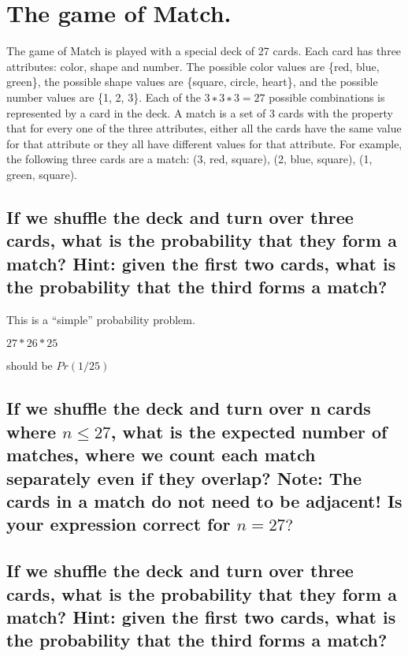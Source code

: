 \documentclass[titlepage]{article}\usepackage[]{graphicx}\usepackage[]{color}
\begin{document}









  \section{ The game of Match. }
  The game of Match is played with a special deck of 27 cards. Each card has
  three attributes: color, shape and number. The possible color values are
  \{red, blue, green\}, the possible shape values are \{square, circle, heart\},
  and the possible number values are \{1, 2, 3\}. Each of the $3 ∗ 3 ∗ 3 = 27$
  possible combinations is represented by a card in the deck. A match is a set
  of 3 cards with the property that for every one of the three attributes,
  either all the cards have the same value for that attribute or they all have
  different values for that attribute. For example, the following three cards
  are a match: (3, red, square), (2, blue, square), (1, green, square).

  \subsection{If we shuffle the deck and turn over three cards, what is the
	  probability that they form a match? Hint: given the first two cards, what
  is the probability that the third forms a match?}

  This is a ``simple'' probability problem. 

  $ 27 * 26 * 25 $ 

  should be $Pr(1/25)$



  \subsection{If we shuffle the deck and turn over n cards where $n ≤ 27$, what
	  is the expected number of matches, where we count each match separately
	  even if they overlap? Note: The cards in a match do not need to be
  adjacent! Is your expression correct for $n = 27?$}


\subsection{ If we shuffle the deck and turn over three cards, what is the
probability that they form a match? Hint: given the first two
cards, what is the probability that the third forms a match?}
\end{document}
